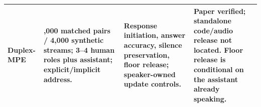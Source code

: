 \begin{table}[H]
\begin{tabular}{@{}>{\raggedright\arraybackslash}p{0.22\tablewidth}>{\raggedright\arraybackslash}p{0.28\tablewidth}>{\raggedright\arraybackslash}p{0.25\tablewidth}>{\raggedright\arraybackslash}p{0.25\tablewidth}@{}}
\addlinespace[4pt]
\textbf{Duplex-MPE}\par\citep{mpe} & 2,000 matched pairs / 4,000 synthetic streams; 3--4 human roles plus assistant; explicit/implicit address. & Response initiation, answer accuracy, silence preservation, floor release; speaker-owned update controls. & Paper verified; standalone code/audio release not located. Floor release is conditional on the assistant already speaking. \\
\bottomrule
\end{tabular}
\end{table}
